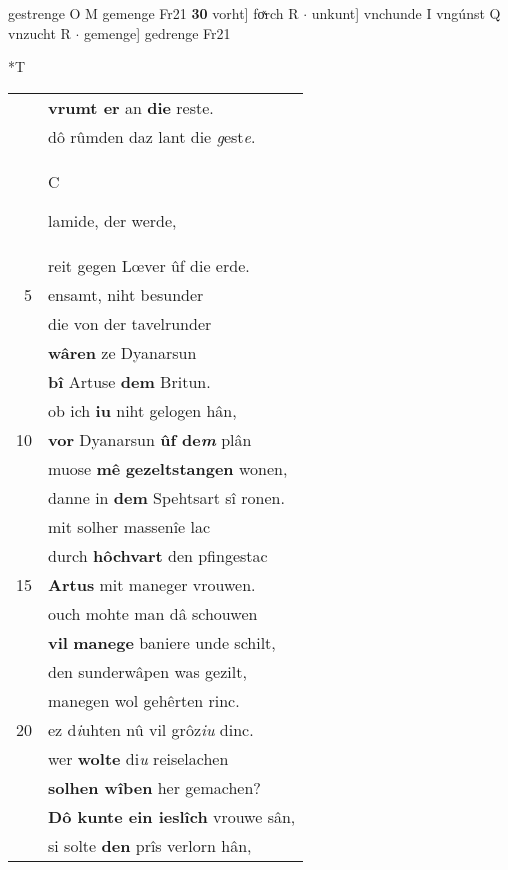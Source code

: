 \documentclass[8pt,a4paper,notitlepage]{article}
\begin{document}
\begin{table}[ht]
\begin{minipage}[t]{0.5\linewidth}
gestrenge O M gemenge Fr21 \textbf{30} vorht] foͯrch R  $\cdot$ unkunt] vnchunde I vngúnst Q vnzucht R  $\cdot$ gemenge] gedrenge Fr21 \newline
\end{minipage}
\hspace{0.5cm}
\begin{minipage}[t]{0.5\linewidth}
\small
\begin{center}*T
\end{center}
\begin{tabular}{rl}
 & \textbf{vrumt er} an \textbf{die} reste.\\ 
 & dô rûmden daz lant die \textit{g}est\textit{e}.\\ 
 & \begin{large}C\end{large}lamide, der werde,\\ 
 & reit gegen Lœver ûf die erde.\\ 
5 & ensamt, niht besunder\\ 
 & die von der tavelrunder\\ 
 & \textbf{wâren} ze Dyanarsun\\ 
 & \textbf{bî} Artuse \textbf{dem} Britun.\\ 
 & ob ich \textbf{iu} niht gelogen hân,\\ 
10 & \textbf{vor} Dyanarsun \textbf{ûf de\textit{m}} plân\\ 
 & muose \textbf{mê} \textbf{gezeltstangen} wonen,\\ 
 & danne in \textbf{dem} Spehtsart sî ronen.\\ 
 & mit solher massenîe lac\\ 
 & durch \textbf{hôchvart} den pfingestac\\ 
15 & \textbf{Artus} mit maneger vrouwen.\\ 
 & ouch mohte man dâ schouwen\\ 
 & \textbf{vil} \textbf{manege} baniere unde schilt,\\ 
 & den sunderwâpen was gezilt,\\ 
 & manegen wol gehêrten rinc.\\ 
20 & ez d\textit{i}uhten nû vil grôz\textit{iu} dinc.\\ 
 & wer \textbf{wolte} di\textit{u} reiselachen\\ 
 & \textbf{solhen wîben} her gemachen?\\ 
 & \textbf{Dô kunte ein ieslîch} vrouwe sân,\\ 
 & si solte \textbf{den} prîs verlorn hân,\\ 

\end{tabular}
\end{minipage}
\end{table}
\end{document}
